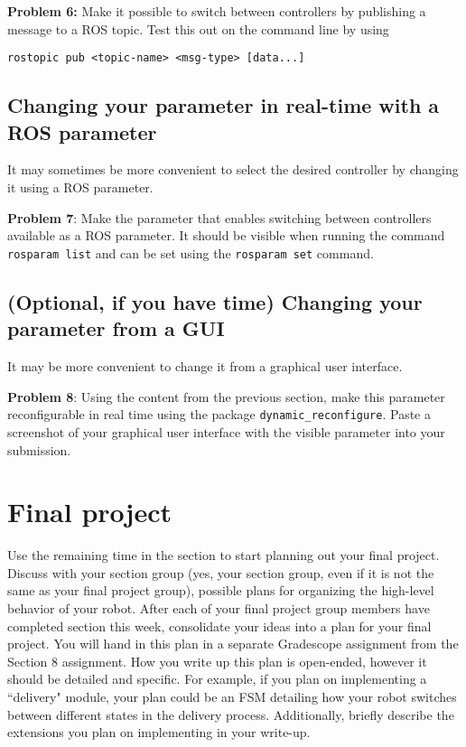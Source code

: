 \documentclass{article}
\begin{document}
\textbf{Problem 6: } Make it possible to switch between controllers by publishing a message to a ROS topic. Test this out on the command line by using
\begin{lstlisting}
rostopic pub <topic-name> <msg-type> [data...]
\end{lstlisting}

\subsection{Changing your parameter in real-time with a ROS parameter}
It may sometimes be more convenient to select the desired controller by changing it using a ROS parameter.

\textbf{Problem 7}: Make the parameter that enables switching between controllers available as a ROS parameter. It should be visible when running the command \texttt{rosparam list} and can be set using the \texttt{rosparam set} command.

\subsection{(Optional, if you have time) Changing your parameter from a GUI}
It may be more convenient to change it from a graphical user interface. 

\textbf{Problem 8}: Using the content from the previous section, make this parameter reconfigurable in real time using the package 
\texttt{dynamic\_reconfigure}. Paste a screenshot of your graphical user interface with the visible parameter into your submission.

\section{Final project}
Use the remaining time in the section to start planning out your final project. Discuss with your section group (yes, your section group, even if it is not the same as your final project group), possible plans for organizing the high-level behavior of your robot. 
After each of your final project group members have completed section this week, consolidate your ideas into a plan for your final project. You will hand in this plan in a separate Gradescope assignment from the Section 8 assignment. 
How you write up this plan is open-ended, however it should be detailed and specific. For example, if you plan on implementing a ``delivery" module, your plan could be an FSM detailing how your robot switches between different states in the delivery process.
Additionally, briefly describe the extensions you plan on implementing in your write-up.
\end{document}
